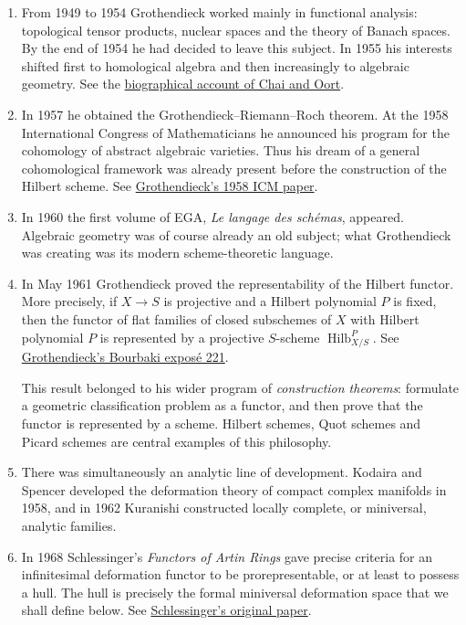 \begin{enumerate}
\item From 1949 to 1954 Grothendieck worked
mainly in functional analysis: topological
tensor products, nuclear spaces and the
theory of Banach spaces. By the end of 1954
he had decided to leave this subject. In
1955 his interests shifted first to
homological algebra and then increasingly to
algebraic geometry. See the
\href{https://research-portal.uu.nl/ws/portalfiles/portal/254168358/Life_and_Work_of_Alexander_Grothendieck.pdf}
{biographical account of Chai and Oort}.

\item In 1957 he obtained the
Grothendieck--Riemann--Roch theorem. At the
1958 International Congress of
Mathematicians he announced his program for
the cohomology of abstract algebraic
varieties. Thus his dream of a general
cohomological framework was already present
before the construction of the Hilbert
scheme. See
\href{https://webusers.imj-prg.fr/~leila.schneps/grothendieckcircle/CohomologyVarieties.pdf}
{Grothendieck's 1958 ICM paper}.

\item In 1960 the first volume of EGA,
\emph{Le langage des sch\'emas}, appeared.
Algebraic geometry was of course already an
old subject; what Grothendieck was creating
was its modern scheme-theoretic language.

\item In May 1961 Grothendieck proved the
representability of the Hilbert functor. More
precisely, if $X\to S$ is projective and a
Hilbert polynomial $P$ is fixed, then the
functor of flat families of closed
subschemes of $X$ with Hilbert polynomial
$P$ is represented by a projective
$S$-scheme $\operatorname{Hilb}^P_{X/S}$.
See
\href{https://www.numdam.org/item/SB_1960-1961__6__249_0/}
{Grothendieck's Bourbaki expos\'e 221}.

This result belonged to his wider program of
\emph{construction theorems}: formulate a
geometric classification problem as a
functor, and then prove that the functor is
represented by a scheme. Hilbert schemes,
Quot schemes and Picard schemes are central
examples of this philosophy.

\item There was simultaneously an analytic
line of development. Kodaira and Spencer
developed the deformation theory of compact
complex manifolds in 1958, and in 1962
Kuranishi constructed locally complete, or
miniversal, analytic families.

\item In 1968 Schlessinger's
\emph{Functors of Artin Rings} gave precise
criteria for an infinitesimal deformation
functor to be prorepresentable, or at least
to possess a hull. The hull is precisely the
formal miniversal deformation space that we
shall define below. See
\href{https://doi.org/10.1090/S0002-9947-1968-0217093-3}
{Schlessinger's original paper}.


\end{enumerate}
